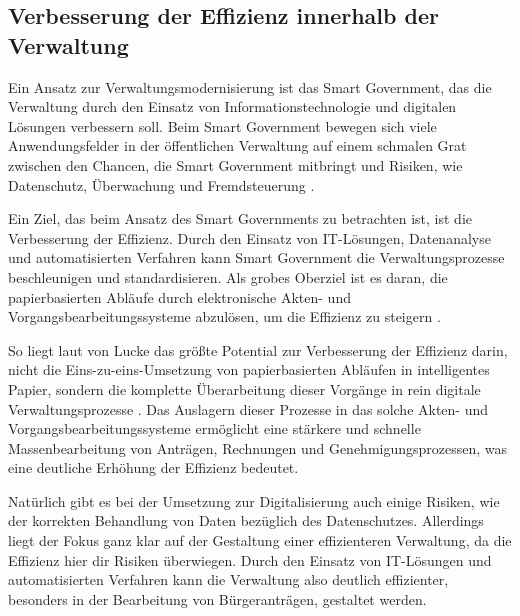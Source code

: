 \subsection{Verbesserung der Effizienz innerhalb der Verwaltung}
Ein Ansatz zur Verwaltungsmodernisierung ist das Smart Government, das die Verwaltung durch den Einsatz von Informationstechnologie und digitalen Lösungen verbessern soll.
Beim Smart Government bewegen sich viele Anwendungsfelder in der öffentlichen Verwaltung auf einem schmalen Grat zwischen den Chancen, die Smart Government mitbringt und Risiken, wie Datenschutz, Überwachung und Fremdsteuerung \citep[Vgl.][]{Lucke2018}.
\par
Ein Ziel, das beim Ansatz des Smart Governments zu betrachten ist, ist die Verbesserung der Effizienz.
Durch den Einsatz von IT-Lösungen, Datenanalyse und automatisierten Verfahren kann Smart Government die Verwaltungsprozesse beschleunigen und standardisieren. 
Als grobes Oberziel ist es daran, die papierbasierten Abläufe durch elektronische Akten- und Vorgangsbearbeitungssysteme abzulösen, um die Effizienz zu steigern \citep[][]{von_Lucke_2016}.
\par
So liegt laut von Lucke das größte Potential zur Verbesserung der Effizienz darin, nicht die Eins-zu-eins-Umsetzung von papierbasierten Abläufen in intelligentes Papier, sondern die komplette Überarbeitung dieser Vorgänge in rein digitale Verwaltungsprozesse \citep[][S.179]{von_Lucke_2016}.
Das Auslagern dieser Prozesse in das solche Akten- und Vorgangsbearbeitungssysteme ermöglicht eine stärkere und schnelle Massenbearbeitung von Anträgen, Rechnungen und Genehmigungsprozessen, was eine deutliche Erhöhung der Effizienz bedeutet.
\par
Natürlich gibt es bei der Umsetzung zur Digitalisierung auch einige Risiken, wie der korrekten Behandlung von Daten bezüglich des Datenschutzes.
Allerdings liegt der Fokus ganz klar auf der Gestaltung einer effizienteren Verwaltung, da die Effizienz hier dir Risiken überwiegen.
Durch den Einsatz von IT-Lösungen und automatisierten Verfahren kann die Verwaltung also deutlich effizienter, besonders in der Bearbeitung von Bürgeranträgen, gestaltet werden.